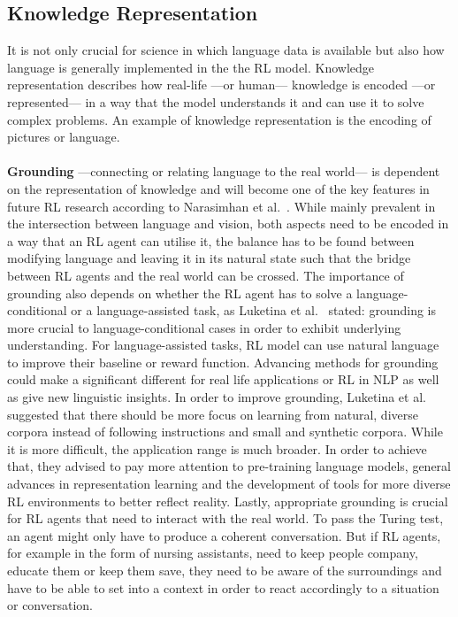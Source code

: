 \documentclass[11pt]{article}
\begin{document}
\subsection{Knowledge Representation}\label{knowledgerepresentation}
It is not only crucial for science in which language data is available but also how language is generally implemented in the the RL model. Knowledge representation describes how real-life ---or human--- knowledge is encoded ---or represented--- in a way that the model understands it and can use it to solve complex problems. An example of knowledge representation is the encoding of pictures or language.\\\\
\textbf{Grounding} ---connecting or relating language to the real world--- is dependent on the representation of knowledge and will become one of the key features in future RL research according to Narasimhan et al.~. While mainly prevalent in the intersection between language and vision, both aspects need to be encoded in a way that an RL agent can utilise it, the balance has to be found between modifying language and leaving it in its natural state such that the bridge between RL agents and the real world can be crossed. The importance of grounding also depends on whether the RL agent has to solve a language-conditional or a language-assisted task, as Luketina et al.~ stated: grounding is more crucial to language-conditional cases in order to exhibit underlying understanding. For language-assisted tasks, RL model can use natural language to improve their baseline or reward function. Advancing methods for grounding could make a significant different for real life applications or RL in NLP as well as give new linguistic insights. In order to improve grounding, Luketina et al.
~ suggested that there should be more focus on learning from natural, diverse corpora instead of following instructions and small and synthetic corpora. While it is more difficult, the application range is much broader. In order to achieve that, they advised to pay more attention to pre-training language models, general advances in representation learning and the development of tools for more diverse RL environments to better reflect reality. Lastly, appropriate grounding is crucial for RL agents that need to interact with the real world. To pass the Turing test, an agent might only have to produce a coherent conversation. But if RL agents, for example in the form of nursing assistants, need to keep people company, educate them or keep them save, they need to be aware of the surroundings and have to be able to set into a context in order to react accordingly to a situation or conversation. 
\end{document}
